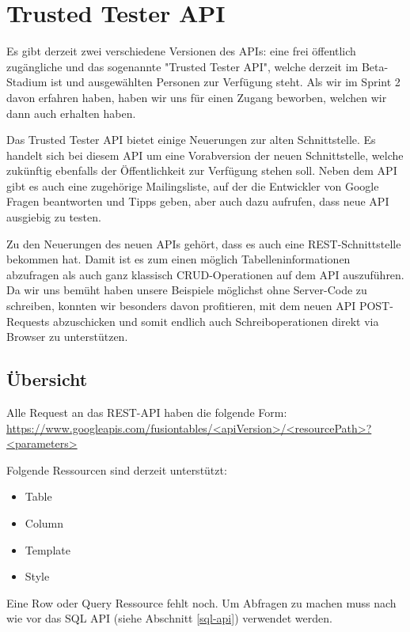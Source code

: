 \section{Trusted Tester API}
\label{trusted-tester-api}
Es gibt derzeit zwei verschiedene Versionen des APIs: eine frei öffentlich zugängliche und das sogenannte "Trusted Tester API", welche derzeit im Beta-Stadium ist und ausgewählten Personen zur Verfügung steht. Als wir im Sprint 2 davon erfahren haben, haben wir uns für einen Zugang beworben, welchen wir dann auch erhalten haben.

Das Trusted Tester API bietet einige Neuerungen zur alten Schnittstelle. Es handelt sich bei diesem API um eine Vorabversion der neuen Schnittstelle, welche zukünftig ebenfalls der Öffentlichkeit zur Verfügung stehen soll. Neben dem API gibt es auch eine zugehörige Mailingsliste, auf der die Entwickler von Google Fragen beantworten und Tipps geben, aber auch dazu aufrufen, dass neue API ausgiebig zu testen.

Zu den Neuerungen des neuen APIs gehört, dass es auch eine REST-Schnittstelle\cite{rest} bekommen hat. Damit ist es zum einen möglich Tabelleninformationen abzufragen als auch ganz klassisch CRUD-Operationen auf dem API auszuführen. Da wir uns bemüht haben unsere Beispiele möglichst ohne Server-Code zu schreiben, konnten wir besonders davon profitieren, mit dem neuen API POST-Requests abzuschicken und somit endlich auch Schreiboperationen direkt via Browser zu unterstützen. 

\subsection{Übersicht}
Alle Request an das REST-API haben die folgende Form:
\url{https://www.googleapis.com/fusiontables/<apiVersion>/<resourcePath>?<parameters>}

Folgende Ressourcen sind derzeit unterstützt:
\begin{itemize}
	\item Table
	\item Column
	\item Template
	\item Style
\end{itemize}

Eine Row oder Query Ressource fehlt noch. Um Abfragen zu machen muss nach wie vor das SQL API (siehe Abschnitt \ref{sql-api}) verwendet werden.

